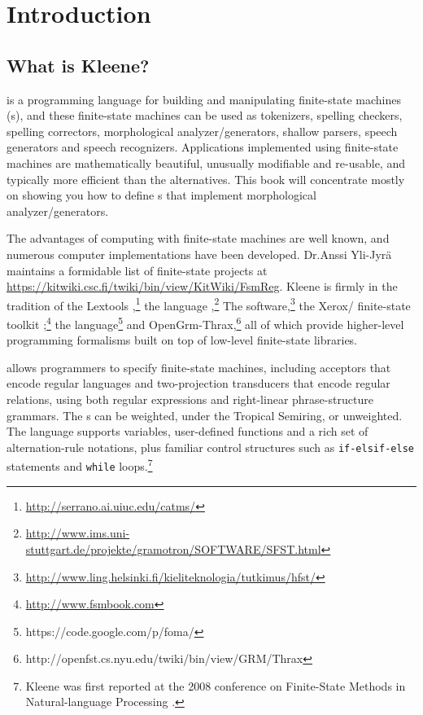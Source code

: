 \chapter{Introduction}

\section{What is Kleene?}

\Kleene{} is a programming language for building and manipulating
finite-state machines (\fsm{}s), and these finite-state machines can be
used as tokenizers, spelling checkers, spelling correctors,
morphological analyzer/generators, shallow parsers, speech generators
and speech recognizers.
Applications implemented using finite-state machines are mathematically
beautiful, unusually modifiable and re-usable, and typically more
efficient than the alternatives.  This book will concentrate mostly on
showing you how to define
\fsm{}s that implement morphological analyzer/generators.

The advantages of computing with finite-state machines are well known,
and numerous computer implementations have been developed.  Dr.\@ Anssi
Yli-Jyrä maintains a formidable list of finite-state projects at
\url{https://kitwiki.csc.fi/twiki/bin/view/KitWiki/FsmReg}.  Kleene is
firmly in the tradition of the  Lextools
\citep{roark+sproat:2007},\footnote{\url{http://serrano.ai.uiuc.edu/catms/}}
the  language
\citep{schmid:2005},\footnote{\url{http://www.ims.uni-stuttgart.de/projekte/gramotron/SOFTWARE/SFST.html}}
The 
software,\footnote{\url{http://www.ling.helsinki.fi/kieliteknologia/tutkimus/hfst/}}
the Xerox/ finite-state toolkit
\citep{beesley+karttunen:2003};\footnote{\url{http://www.fsmbook.com}}
the  language\footnote{https://code.google.com/p/foma/}
and
OpenGrm-Thrax,\footnote{http://openfst.cs.nyu.edu/twiki/bin/view/GRM/Thrax}
all of which provide higher-level programming formalisms built on top of
low-level finite-state libraries.  

\Kleene{} allows programmers to
specify finite-state machines, including acceptors that encode
regular languages and two-projection transducers that encode regular
relations, using both regular expressions and right-linear
phrase-structure grammars. The \fsm{}s can be weighted, under the
Tropical Semiring, or unweighted.  The language supports variables, 
user-defined functions and a rich set of alternation-rule notations, 
plus familiar control structures such as \verb!if-elsif-else!
statements and \verb!while! loops.\footnote{Kleene was first reported
at the 2008 conference on Finite-State Methods in Natural-language
Processing \citep{beesley:2009}.}

